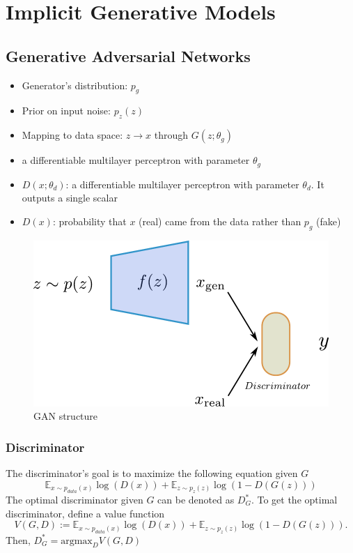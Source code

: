 \chapter{Implicit Generative Models}
\section{Generative Adversarial Networks}
\label{sec:gan}
\begin{itemize}
	\item Generator's distribution: $p_{g}$
	\item Prior on input noise: $p_{z}(z)$
	\item Mapping to data space: $z\rightarrow x$ through $G(z;\theta_{g})$
	\item[] a differentiable multilayer perceptron with parameter $\theta_{g}$
	\item $D(x;\theta_{d})$: a differentiable multilayer perceptron with parameter $\theta_{d}$. It outputs a single scalar 
	\item $D(x)$: probability that $x$ (real) came from the data rather than $p_g$ (fake)
\end{itemize}

\begin{figure}[h]
	\begin{center}
		\includegraphics[scale=0.5]{./images/generative/gan/gan_model.pdf}
	\end{center}
	\caption{GAN structure}
	\label{fig:gan}
\end{figure}

\subsection{Discriminator}
The discriminator's goal is to maximize the following equation given $G$
\begin{equation*}
\mathbb{E}_{x \sim p_{data}(x)}\log(D(x))+\mathbb{E}_{z \sim p_{z}(z)}\log(1-D(G(z)))
\end{equation*}
The optimal discriminator given $G$ can be denoted as $D^*_{G}$. To get the optimal discriminator, define a value function
\begin{equation*}
V(G,D):= \mathbb{E}_{x \sim p_{data}(x)}\log(D(x))+\mathbb{E}_{z \sim p_z(z)}\log(1-D(G(z))).
\end{equation*}
Then, $D_G^* = \text{argmax}_D V(G,D)$

